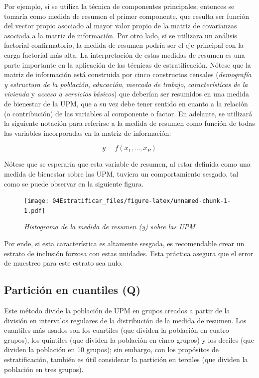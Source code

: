 \documentclass[
  10pt,
  spanish,
]{book}
\begin{document}
Por ejemplo, si se utiliza la técnica de componentes principales, entonces se tomaría como medida de resumen el primer componente, que resulta ser función del vector propio asociado al mayor valor propio de la matriz de covarianzas asociada a la matriz de información. Por otro lado, si se utilizara un análisis factorial confirmatorio, la medida de resumen podría ser el eje principal con la carga factorial más alta. La interpretación de estas medidas de resumen es una parte importante en la aplicación de las técnicas de estratificación. Nótese que la matriz de información está construida por cinco constructos censales (\emph{demografía y estructura de la población}, \emph{educación}, \emph{mercado de trabajo}, \emph{características de la vivienda} y \emph{acceso a servicios básicos}) que deberían ser resumidos en una medida de bienestar de la UPM, que a su vez debe tener sentido en cuanto a la relación (o contribución) de las variables al componente o factor. En adelante, se utilizará la siguiente notación para referirse a la medida de resumen como función de todas las variables incorporadas en la matriz de información:

\[
y = f(x_1,\ldots, x_P)
\]

Nótese que se esperaría que esta variable de resumen, al estar definida como una medida de bienestar sobre las UPM, tuviera un comportamiento sesgado, tal como se puede observar en la siguiente figura.

\begin{figure}
\centering
\texttt{[image: 04Estratificar\_files/figure-latex/unnamed-chunk-1-1.pdf]}
\caption{\label{fig:unnamed-chunk-1}\emph{Histograma de la medida de resumen (y) sobre las UPM}}
\end{figure}

Por ende, si esta característica es altamente sesgada, es recomendable crear un estrato de inclusión forzosa con estas unidades. Esta práctica asegura que el error de muestreo para este estrato sea nulo.

\hypertarget{particiuxf3n-en-cuantiles-q}{%
\subsection*{Partición en cuantiles (Q)}\label{particiuxf3n-en-cuantiles-q}}

Este método divide la población de UPM en grupos creados a partir de la división en intervalos regulares de la distribución de la medida de resumen. Los cuantiles más usados son los cuartiles (que dividen la población en cuatro grupos), los quintiles (que dividen la población en cinco grupos) y los deciles (que dividen la población en 10 grupos); sin embargo, con los propósitos de estratificación, también es útil considerar la partición en terciles (que dividen la población en tres grupos).
\end{document}
